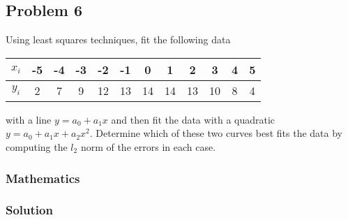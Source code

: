 \subsection{Problem 6}%
\label{sec:problem_6}
Using least squares techniques, fit the following data
\begin{center}
  \begin{tabular}{|c|c|c|c|c|c|c|c|c|c|c|c|}
    \hline
    $x_i$ & -5 & -4 & -3 & -2 & -1 & 0 & 1 & 2 & 3 & 4 & 5 \\
    \hline
    $y_i$ & 2 & 7 & 9 & 12 & 13 & 14 & 14 & 13 & 10 & 8 & 4 \\
    \hline
  \end{tabular}
\end{center}
with a line $y=a_0+a_1x$ and then fit the data with a quadratic $y=a_0+a_1x+a_2x^2$.
Determine which of these two curves best fits the data by computing the $l_2$ norm of
the errors in each case.
\subsubsection*{Mathematics}
\subsubsection*{Solution}
